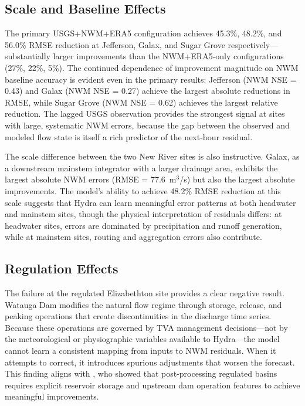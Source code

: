 \documentclass[draft]{agujournal2019}
\begin{document}
\subsection{Scale and Baseline Effects}

The primary USGS+NWM+ERA5 configuration achieves 45.3\%, 48.2\%, and 56.0\% RMSE reduction at Jefferson, Galax, and Sugar Grove respectively---substantially larger improvements than the NWM+ERA5-only configurations (27\%, 22\%, 5\%). The continued dependence of improvement magnitude on NWM baseline accuracy is evident even in the primary results: Jefferson (NWM NSE = 0.43) and Galax (NWM NSE = 0.27) achieve the largest absolute reductions in RMSE, while Sugar Grove (NWM NSE = 0.62) achieves the largest relative reduction. The lagged USGS observation provides the strongest signal at sites with large, systematic NWM errors, because the gap between the observed and modeled flow state is itself a rich predictor of the next-hour residual.

The scale difference between the two New River sites is also instructive. Galax, as a downstream mainstem integrator with a larger drainage area, exhibits the largest absolute NWM errors (RMSE = 77.6~m$^3$/s) but also the largest absolute improvements. The model's ability to achieve 48.2\% RMSE reduction at this scale suggests that Hydra can learn meaningful error patterns at both headwater and mainstem sites, though the physical interpretation of residuals differs: at headwater sites, errors are dominated by precipitation and runoff generation, while at mainstem sites, routing and aggregation errors also contribute.

\subsection{Regulation Effects}

The failure at the regulated Elizabethton site provides a clear negative result. Watauga Dam modifies the natural flow regime through storage, release, and peaking operations that create discontinuities in the discharge time series. Because these operations are governed by TVA management decisions---not by the meteorological or physiographic variables available to Hydra---the model cannot learn a consistent mapping from inputs to NWM residuals. When it attempts to correct, it introduces spurious adjustments that worsen the forecast. This finding aligns with , who showed that post-processing regulated basins requires explicit reservoir storage and upstream dam operation features to achieve meaningful improvements.
\end{document}
